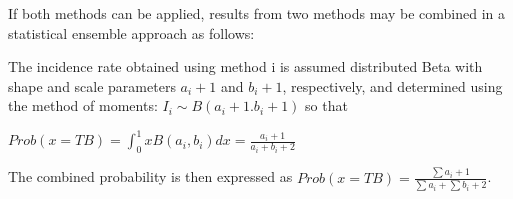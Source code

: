 If both methods can be applied, results from two methods may be combined in a statistical ensemble approach as follows:

The incidence rate obtained using method i is assumed distributed Beta with shape and scale parameters $a_i + 1$ and $b_i + 1$, respectively, and determined using the method of moments: $I_i \sim B(a_i + 1. b_i + 1)$ so that 

$Prob(x=TB)= \int_{0}^{1} x B(a_i,b_i) dx = \frac{a_i+1}{a_i+b_i+2}$

The combined probability is then expressed as 
$Prob(x=TB) = \frac{\sum{a_i}+1}{\sum{a_i}+\sum{b_i}+2}$. 




